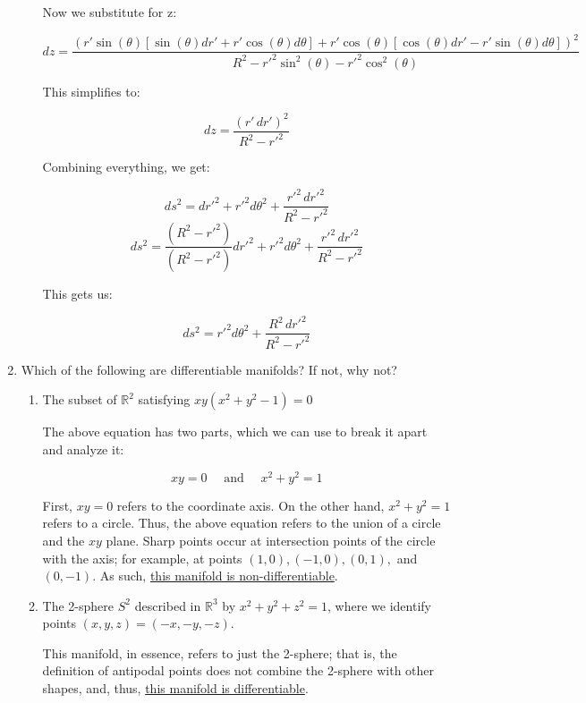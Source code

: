 \begin{enumerate}
\begin{enumerate}
        Now we substitute for z:

        $$dz=\frac{(r\prime\sin(\theta)[\sin(\theta)dr\prime+r\prime\cos(\theta)d\theta]+r\prime\cos(\theta)[\cos(\theta)dr\prime-r\prime\sin(\theta)d\theta])^2}{R^2-r\prime^2\sin^2(\theta)-r\prime^2\cos^2(\theta)}$$

        This simplifies to:

        $$dz=\frac{(r\prime\,dr\prime)^2}{R^2-r\prime^2}$$

        Combining everything, we get:

        $$ds^2=dr\prime^2+r\prime^2d\theta^2+\frac{r\prime^2\,dr\prime^2}{R^2-r\prime^2}$$
        $$ds^2=\frac{(R^2-r\prime^2)}{(R^2-r\prime^2)}dr\prime^2+r\prime^2d\theta^2+\frac{r\prime^2\,dr\prime^2}{R^2-r\prime^2}$$

        This gets us:

        $$\boxed{ds^2=r\prime^2d\theta^2+\frac{R^2\,dr\prime^2}{R^2-r\prime^2}}$$

    \end{enumerate}

  \item Which of the following are differentiable manifolds? If not, why not?

    \begin{enumerate}

      \item The subset of $\mathbb{R}^2$ satisfying $xy(x^2 + y^2 - 1) = 0$

        The above equation has two parts, which we can use to break it apart and analyze it:

        $$xy=0\quad\text{ and }\quad x^2+y^2=1$$

        First, $xy=0$ refers to the coordinate axis. On the other hand, $x^2+y^2=1$ refers to a circle. Thus, the above equation refers to the union of a circle and the $xy$ plane. Sharp points occur at intersection points of the circle with the axis; for example, at points $(1,0), (-1,0), (0,1),$ and $(0,-1)$. As such, \underline{this manifold is non-differentiable}.

      \item The 2-sphere $S^2$ described in $\mathbb{R}^3$ by $x^2 + y^2 + z^2 = 1$, where we identify points $(x, y, z) = (-x, -y, -z)$.

        This manifold, in essence, refers to just the 2-sphere; that is, the definition of antipodal points does not combine the 2-sphere with other shapes, and, thus, \underline{this manifold is differentiable}.


\end{enumerate}
\end{enumerate}
